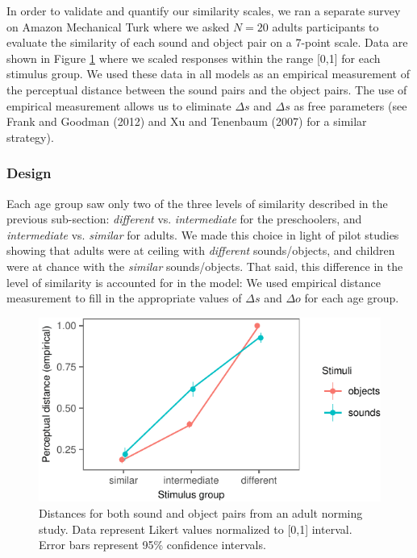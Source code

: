 \documentclass[english,,man]{apa6}
\theoremstyle{definition}
\theoremstyle{definition}
\theoremstyle{definition}
\theoremstyle{remark}
\begin{document}
In order to validate and quantify our similarity scales, we ran a
separate survey on Amazon Mechanical Turk where we asked \(N=20\) adults
participants to evaluate the similarity of each sound and object pair on
a 7-point scale. Data are shown in Figure \ref{fig:stim} where we scaled
responses within the range {[}0,1{]} for each stimulus group. We used
these data in all models as an empirical measurement of the perceptual
distance between the sound pairs and the object pairs. The use of
empirical measurement allows us to eliminate \(\Delta s\) and
\(\Delta s\) as free parameters (see Frank and Goodman (2012) and Xu and
Tenenbaum (2007) for a similar strategy).

\subsubsection{Design}\label{design}

Each age group saw only two of the three levels of similarity described
in the previous sub-section: \emph{different} vs. \emph{intermediate}
for the preschoolers, and \emph{intermediate} vs. \emph{similar} for
adults. We made this choice in light of pilot studies showing that
adults were at ceiling with \emph{different} sounds/objects, and
children were at chance with the \emph{similar} sounds/objects. That
said, this difference in the level of similarity is accounted for in the
model: We used empirical distance measurement to fill in the appropriate
values of \(\Delta s\) and \(\Delta o\) for each age group.

\begin{figure}[h]

{\centering \includegraphics{ms_blind_files/figure-latex/stim-1} 

}

\caption{Distances for both sound and object pairs from an adult norming study. Data represent Likert values normalized to [0,1] interval. Error bars represent 95\% confidence intervals.}\label{fig:stim}
\end{figure}
\end{document}
